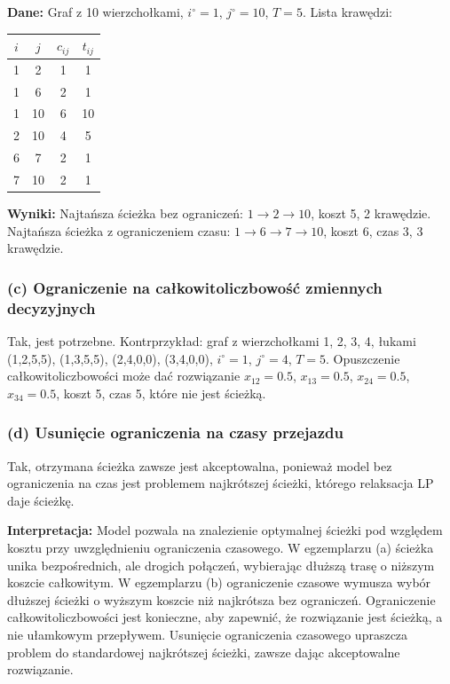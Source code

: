 \documentclass[a4paper,12pt]{article}
\begin{document}
\textbf{Dane:} Graf z 10 wierzchołkami, $i^\circ = 1$, $j^\circ = 10$, $T = 5$. Lista krawędzi:

\begin{center}
\begin{tabular}{cccc}
$i$ & $j$ & $c_{ij}$ & $t_{ij}$ \\
\hline
1 & 2 & 1 & 1 \\
1 & 6 & 2 & 1 \\
1 & 10 & 6 & 10 \\
2 & 10 & 4 & 5 \\
6 & 7 & 2 & 1 \\
7 & 10 & 2 & 1 \\
\end{tabular}
\end{center}

\textbf{Wyniki:} Najtańsza ścieżka bez ograniczeń: $1 \to 2 \to 10$, koszt 5, 2 krawędzie. Najtańsza ścieżka z ograniczeniem czasu: $1 \to 6 \to 7 \to 10$, koszt 6, czas 3, 3 krawędzie.

\subsubsection*{(c) Ograniczenie na całkowitoliczbowość zmiennych decyzyjnych}

Tak, jest potrzebne. Kontrprzykład: graf z wierzchołkami 1, 2, 3, 4, łukami (1,2,5,5), (1,3,5,5), (2,4,0,0), (3,4,0,0), $i^\circ=1$, $j^\circ=4$, $T=5$. Opuszczenie całkowitoliczbowości może dać rozwiązanie $x_{12}=0.5$, $x_{13}=0.5$, $x_{24}=0.5$, $x_{34}=0.5$, koszt 5, czas 5, które nie jest ścieżką.

\subsubsection*{(d) Usunięcie ograniczenia na czasy przejazdu}

Tak, otrzymana ścieżka zawsze jest akceptowalna, ponieważ model bez ograniczenia na czas jest problemem najkrótszej ścieżki, którego relaksacja LP daje ścieżkę.

\textbf{Interpretacja:} Model pozwala na znalezienie optymalnej ścieżki pod względem kosztu przy uwzględnieniu ograniczenia czasowego. W egzemplarzu (a) ścieżka unika bezpośrednich, ale drogich połączeń, wybierając dłuższą trasę o niższym koszcie całkowitym. W egzemplarzu (b) ograniczenie czasowe wymusza wybór dłuższej ścieżki o wyższym koszcie niż najkrótsza bez ograniczeń. Ograniczenie całkowitoliczbowości jest konieczne, aby zapewnić, że rozwiązanie jest ścieżką, a nie ułamkowym przepływem. Usunięcie ograniczenia czasowego upraszcza problem do standardowej najkrótszej ścieżki, zawsze dając akceptowalne rozwiązanie.
\end{document}
